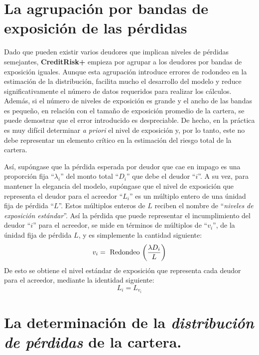 \documentclass[
  12pt,
]{krantz}
\theoremstyle{definition}
\theoremstyle{definition}
\theoremstyle{definition}
\theoremstyle{remark}
\begin{document}
\hypertarget{la-agrupacion-por-bandas-de-exposicion-de-las-perdidas}{%
\section{La agrupación por bandas de exposición de las pérdidas}\label{la-agrupacion-por-bandas-de-exposicion-de-las-perdidas}}

Dado que pueden existir varios deudores que implican niveles de pérdidas semejantes, \textbf{CreditRisk+} empieza por agrupar a los deudores por bandas de exposición iguales. Aunque esta agrupación introduce errores de rodondeo en la estimación de la distribución, facilita mucho el desarrollo del modelo y reduce significativamente el número de datos requeridos para realizar los cálculos. Además, si el número de niveles de exposición es grande y el ancho de las bandas es pequeño, en relación con el tamaño de exposición promedio de la cartera, se puede demostrar que el error introducido es despreciable. De hecho, en la práctica es muy difícil determinar \emph{a priori} el nivel de exposición y, por lo tanto, este no debe representar un elemento crítico en la estimación del riesgo total de la cartera.

Así, supóngase que la pérdida esperada por deudor que cae en impago es una proporción fija ``\(\lambda_i\)'' del monto total ``\(D_i\)'' que debe el deudor ``\(i\)''. A su vez, para mantener la elegancia del modelo, supóngase que el nivel de exposición que representa el deudor para el acreedor ``\(L_i\)'' es un múltiplo entero de una únidad fija de pérdida ``\(L\)''. Estos múltiplos enteros de \(L\) reciben el nombre de ``\emph{niveles de exposición estándar}''. Así la pérdida que puede representar el incumplimiento del deudor ``\(i\)'' para el acreedor, se mide en términos de múltiplos de ``\(v_i\)'', de la únidad fija de pérdida \(L\), y es simplemente la cantidad siguiente:\[v_i=\textrm{ Redondeo }\bigg{(}\frac{\lambda D_i}{L}\bigg{)}\]
De esto se obtiene el nivel estándar de exposición que representa cada deudor para el acreedor, mediante la identidad siguiente:\[L_i=L_{v_i}\]

\hypertarget{la-determinacion-de-la-distribucion-de-perdidas-de-la-cartera.}{%
\section{\texorpdfstring{La determinación de la \emph{distribución de pérdidas} de la cartera.}{La determinación de la distribución de pérdidas de la cartera.}}\label{la-determinacion-de-la-distribucion-de-perdidas-de-la-cartera.}}
\end{document}
